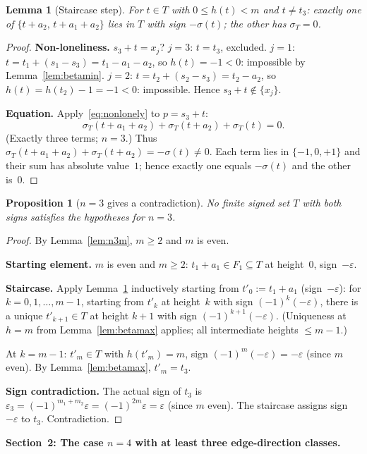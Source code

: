 \documentclass{article}
\newtheorem{lemma}{Lemma}
\newtheorem{prop}{Proposition}
\begin{document}
\begin{lemma}[Staircase step]\label{lem:step}
For $t\in T$ with $0\le h(t)<m$ and $t\ne t_3$:
exactly one of $\{t+a_2,\,t+a_1+a_2\}$ lies in $T$ with sign $-\sigma(t)$;
the other has $\sigma_T=0$.
\end{lemma}
\begin{proof}
\textbf{Non-loneliness.}
$s_3+t=x_j$?
$j=3$: $t=t_3$, excluded.
$j=1$: $t=t_1+(s_1-s_3)=t_1-a_1-a_2$, so $h(t)=-1<0$: impossible by Lemma~\ref{lem:betamin}.
$j=2$: $t=t_2+(s_2-s_3)=t_2-a_2$, so $h(t)=h(t_2)-1=-1<0$: impossible.
Hence $s_3+t\notin\{x_j\}$.

\textbf{Equation.}
Apply~\eqref{eq:nonlonely} to $p=s_3+t$:
\[
  \sigma_T(t+a_1+a_2)+\sigma_T(t+a_2)+\sigma_T(t)=0.
\]
(Exactly three terms; $n=3$.)
Thus $\sigma_T(t+a_1+a_2)+\sigma_T(t+a_2)=-\sigma(t)\ne 0$.
Each term lies in $\{-1,0,+1\}$ and their sum has absolute value~$1$;
hence exactly one equals $-\sigma(t)$ and the other is~$0$.
\end{proof}

\begin{prop}[$n=3$ gives a contradiction]\label{prop:n3}
No finite signed set $T$ with both signs satisfies the hypotheses for $n=3$.
\end{prop}
\begin{proof}
By Lemma~\ref{lem:n3m}, $m\ge 2$ and $m$ is even.

\textbf{Starting element.}
$m$ is even and $m\ge 2$: $t_1+a_1\in F_1\subseteq T$ at height~$0$, sign~$-\varepsilon$.

\textbf{Staircase.}
Apply Lemma~\ref{lem:step} inductively starting from $t'_0:=t_1+a_1$ (sign~$-\varepsilon$):
for $k=0,1,\dots,m-1$,
starting from $t'_k$ at height~$k$ with sign $(-1)^k(-\varepsilon)$,
there is a unique $t'_{k+1}\in T$ at height $k+1$ with sign $(-1)^{k+1}(-\varepsilon)$.
(Uniqueness at $h=m$ from Lemma~\ref{lem:betamax} applies; all intermediate heights $\le m-1$.)

At $k=m-1$: $t'_m\in T$ with $h(t'_m)=m$, sign $(-1)^m(-\varepsilon)=-\varepsilon$ (since $m$ even).
By Lemma~\ref{lem:betamax}, $t'_m=t_3$.

\textbf{Sign contradiction.}
The actual sign of $t_3$ is $\varepsilon_3=(-1)^{m_1+m_2}\varepsilon=(-1)^{2m}\varepsilon=\varepsilon$ (since $m$ even).
The staircase assigns sign $-\varepsilon$ to $t_3$. Contradiction.
\end{proof}

\bigskip
\noindent\textbf{Section~2: The case $n=4$ with at least three edge-direction classes.}
\end{document}
